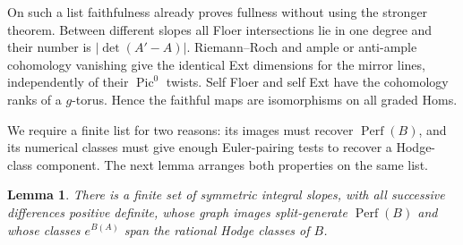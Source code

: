 \documentclass[11pt]{article}
\numberwithin{equation}{section}
\newtheorem{lemma}[theorem]{Lemma}
\theoremstyle{definition}
\theoremstyle{remark}
\newcommand{\Perf}{\operatorname{Perf}}
\begin{document}
On such a list faithfulness already proves fullness without using the
stronger theorem.  Between different slopes all Floer intersections lie
in one degree and their number is $|\det(A'-A)|$.  Riemann--Roch and
ample or anti-ample cohomology vanishing give the identical Ext dimensions
for the mirror lines, independently of their $\operatorname{Pic}^0$
twists.  Self Floer and self Ext have the cohomology ranks of a
$g$-torus.  Hence the faithful maps are isomorphisms on all graded Homs.

We require a finite list for two reasons: its images must recover
$\Perf(B)$, and its numerical classes must give enough Euler-pairing
tests to recover a Hodge-class component.  The next lemma arranges
both properties on the same list.

\begin{lemma}\label{lem:graph-generators}
There is a finite set of symmetric integral slopes, with all successive
differences positive definite, whose graph images split-generate
$\Perf(B)$ and whose classes $e^{B(A)}$ span the rational Hodge classes
of $B$.
\end{lemma}
\end{document}
